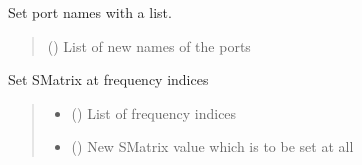 \documentclass[letterpaper,10pt,english]{sphinxmanual}
\begin{document}
\begin{fulllineitems}

\begin{fulllineitems}
\label{\detokenize{touchstone:touchstone.spfile.set_port_names}}
\pysigstartsignatures
{}
\pysigstopsignatures
\sphinxAtStartPar
Set port names with a list.
\begin{quote}\begin{description}
\sphinxAtStartPar
{} () \textendash{} List of new names of the ports

\end{description}\end{quote}

\end{fulllineitems}


\begin{fulllineitems}
\label{\detokenize{touchstone:touchstone.spfile.set_smatrix_at_frequency_point}}
\pysigstartsignatures
{}
\pysigstopsignatures
\sphinxAtStartPar
Set S\sphinxhyphen{}Matrix at frequency indices
\begin{quote}\begin{description}
\begin{itemize}
\item {} 
\sphinxAtStartPar
{} () \textendash{} List of frequency indices

\item {} 
\sphinxAtStartPar
{} () \textendash{} New S\sphinxhyphen{}Matrix value which is to be set at all 

\end{itemize}

\end{description}\end{quote}


\end{fulllineitems}
\end{fulllineitems}
\end{document}
